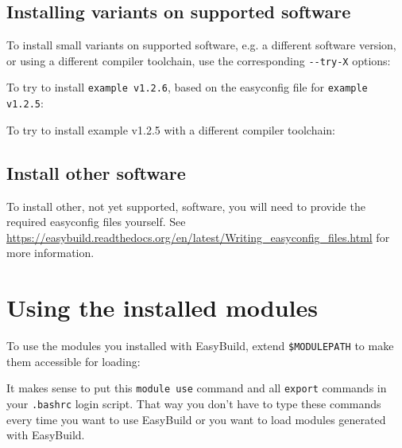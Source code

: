 \begin{prompt}
\end{prompt}

\subsection{Installing variants on supported software}

To install small variants on supported software, e.g. a different software version,
or using a different compiler toolchain, use the corresponding \lstinline|--try-X| options:

To try to install \lstinline|example v1.2.6|, based on the easyconfig file for \lstinline|example v1.2.5|:

\begin{prompt}
\end{prompt}

To try to install example v1.2.5 with a different compiler toolchain:

\begin{prompt}
\end{prompt}

\subsection{Install other software}

To install other, not yet supported, software, you will need to provide the required
easyconfig files yourself. See \url{https://easybuild.readthedocs.org/en/latest/Writing_easyconfig_files.html}
for more information.

\section{Using the installed modules}

To use the modules you installed with EasyBuild, extend \lstinline|$MODULEPATH|
to make them accessible for loading:

\begin{prompt}
\end{prompt}

It makes sense to put this \lstinline|module use| command and all \lstinline|export|
commands in your \lstinline|.bashrc| login script. That way you don't have to type
these commands every time you want to use EasyBuild or you want to load modules generated
with EasyBuild.
